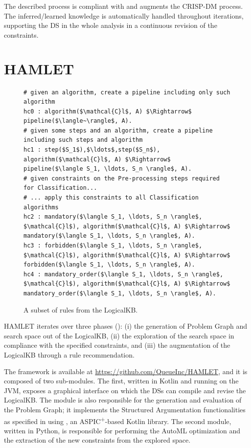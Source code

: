 The described process is compliant with and augments the CRISP-DM process.
The inferred/learned knowledge is automatically handled throughout iterations, supporting the DS in the whole analysis in a continuous revision of the constraints.
\vspace{2cm}

\section{HAMLET}\label{sec:implementation}

\begin{figure}[t]
\begin{lstlisting}[mathescape=true]
# given an algorithm, create a pipeline including only such algorithm
hc0 : algorithm($\mathcal{C}l$, A) $\Rightarrow$ pipeline($\langle~\rangle$, A).
# given some steps and an algorithm, create a pipeline including such steps and algorithm
hc1 : step($S_1$),$\ldots$,step($S_n$), algorithm($\mathcal{C}l$, A) $\Rightarrow$ pipeline($\langle S_1, \ldots, S_n \rangle$, A).
# given constraints on the Pre-processing steps required for Classification...
# ... apply this constraints to all Classification algorithms
hc2 : mandatory($\langle S_1, \ldots, S_n \rangle$, $\mathcal{C}l$), algorithm($\mathcal{C}l$, A) $\Rightarrow$ mandatory($\langle S_1, \ldots, S_n \rangle$, A).
hc3 : forbidden($\langle S_1, \ldots, S_n \rangle$, $\mathcal{C}l$), algorithm($\mathcal{C}l$, A) $\Rightarrow$ forbidden($\langle S_1, \ldots, S_n \rangle$, A).
hc4 : mandatory_order($\langle S_1, \ldots, S_n \rangle$, $\mathcal{C}l$), algorithm($\mathcal{C}l$, A) $\Rightarrow$ mandatory_order($\langle S_1, \ldots, S_n \rangle$, A).
\end{lstlisting}
\caption{A subset of rules from the LogicalKB.}
\label{rules-arg2p}
\end{figure}

HAMLET iterates over three phases (): (i) the generation of Problem Graph and search space out of the LogicalKB, (ii) the exploration of the search space in compliance with the specified constraints, and (iii) the augmentation of the LogicalKB through a rule recommendation.

The framework is available at \url{https://github.com/QueueInc/HAMLET}, and it is composed of two sub-modules. 
The first, written in Kotlin and running on the JVM, exposes a graphical interface on which the DSs can compile and revise the LogicalKB. 
The module is also responsible for the generation and evaluation of the Problem Graph; it implements the Structured Argumentation functionalities as specified in  using \argtup{} \cite{arg2p-jlc}, an ASPIC\textsuperscript{+}-based Kotlin library.
The second module, written in Python, is responsible for performing the AutoML optimization and the extraction of the new constraints from the explored space.

